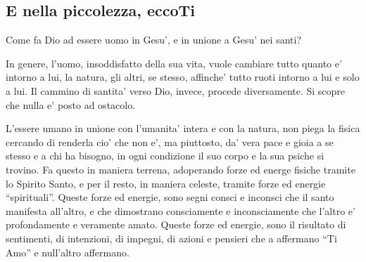 
\subsection{E nella piccolezza, eccoTi}
\label{DioPadreOnnipotenteDef}

Come fa Dio ad essere uomo in Gesu', e in unione a Gesu' nei santi?

In genere, l'uomo, insoddisfatto della sua vita, vuole cambiare tutto quanto e' intorno a lui, la natura, gli altri, se stesso, affinche' tutto ruoti intorno a lui e solo a lui. Il cammino di santita' verso Dio, invece, procede diversamente. Si scopre che nulla e' posto ad ostacolo. 

L'essere umano in unione con l'umanita' intera e con la natura, non piega la fisica cercando di renderla cio' che non e', ma piuttosto, da' vera pace e gioia a se stesso e a chi ha bisogno, in ogni condizione il suo corpo e la sua psiche si trovino. Fa questo in maniera terrena, adoperando forze ed energe fisiche tramite lo Spirito Santo, e per il resto, in maniera celeste, tramite forze ed energie ``spirituali''. Queste forze ed energie, sono segni consci e inconsci che il santo manifesta all'altro, e che dimostrano consciamente e inconsciamente che l'altro e' profondamente e veramente amato. Queste forze ed energie, sono il risultato di sentimenti, di intenzioni, di impegni, di azioni e pensieri che a affermano ``Ti Amo'' e null'altro affermano.

